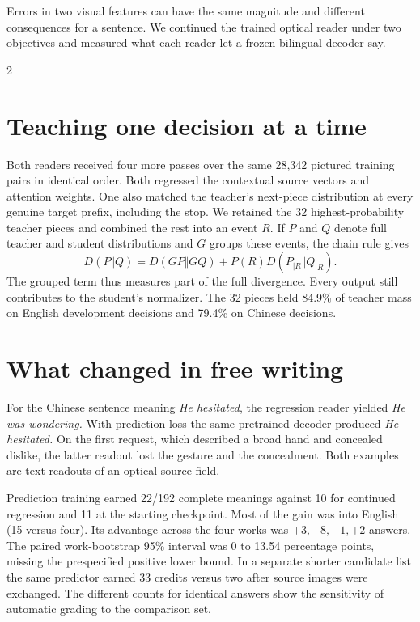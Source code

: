 \newpage
{}
\noindent Errors in two visual features can have the same magnitude and different consequences for a sentence. We continued the trained optical reader under two objectives and measured what each reader let a frozen bilingual decoder say.
\begin{multicols}{2}
\section*{Teaching one decision at a time}
Both readers received four more passes over the same 28,342 pictured training pairs in identical order. Both regressed the contextual source vectors and attention weights. One also matched the teacher's next-piece distribution at every genuine target prefix, including the stop. We retained the 32 highest-probability teacher pieces and combined the rest into an event $R$. If $P$ and $Q$ denote full teacher and student distributions and $G$ groups these events, the chain rule gives
\[
D(P\Vert Q)=D(GP\Vert GQ)+P(R)D(P_{|R}\Vert Q_{|R}).
\]
The grouped term thus measures part of the full divergence. Every output still contributes to the student's normalizer. The 32 pieces held 84.9\% of teacher mass on English development decisions and 79.4\% on Chinese decisions.
\section*{What changed in free writing}
For the Chinese sentence meaning \emph{He hesitated}, the regression reader yielded \emph{He was wondering.} With prediction loss the same pretrained decoder produced \emph{He hesitated.} On the first request, which described a broad hand and concealed dislike, the latter readout lost the gesture and the concealment. Both examples are text readouts of an optical source field.
\par Prediction training earned 22/192 complete meanings against 10 for continued regression and 11 at the starting checkpoint. Most of the gain was into English (15 versus four). Its advantage across the four works was $+3,+8,-1,+2$ answers. The paired work-bootstrap 95\% interval was 0 to 13.54 percentage points, missing the prespecified positive lower bound. In a separate shorter candidate list the same predictor earned 33 credits versus two after source images were exchanged. The different counts for identical answers show the sensitivity of automatic grading to the comparison set.
\end{multicols}

